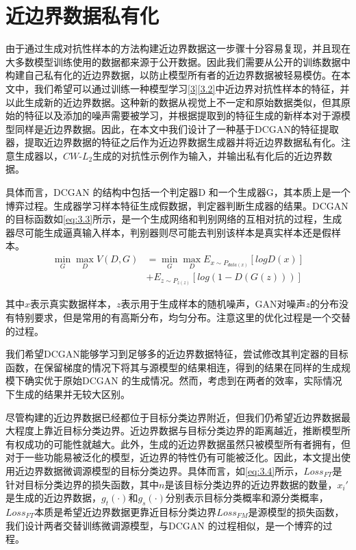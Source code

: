 \section{近边界数据私有化}\label{3.3}

由于通过生成对抗性样本的方法构建近边界数据这一步骤十分容易复现，并且现在大多数模型训练使用的数据都来源于公开数据。因此我们需要从公开的训练数据中构建自己私有化的近边界数据，以防止模型所有者的近边界数据被轻易模仿。在本文中，我们希望可以通过训练一种模型学习\ref{3}\ref{3.2}中近边界对抗性样本的特征，并以此生成新的近边界数据。这种新的数据从视觉上不一定和原始数据类似，但其原始的特征以及添加的噪声需要被学习，并根据提取到的特征生成的新样本对于源模型同样是近边界数据。因此，在本文中我们设计了一种基于DCGAN\cite{radford2015unsupervised}的特征提取器，提取近边界数据的特征之后作为近边界数据生成器并将近边界数据私有化。注意生成器以，$CW$-$L_2$生成的对抗性示例作为输入，并输出私有化后的近边界数据。

具体而言，DCGAN 的结构中包括一个判定器D 和一个生成器G，其本质上是一个博弈过程。生成器学习样本特征生成假数据，判定器判断生成器的结果。DCGAN 的目标函数如\ref{eq:3.3}所示，是一个生成网络和判别网络的互相对抗的过程，生成器尽可能生成逼真输入样本，判别器则尽可能去判别该样本是真实样本还是假样本。
\begin{equation}
	\label{eq:3.3}
	\begin{split}
		\mathop{min} \limits_{G} \mathop{max} \limits_{D} V(D, G) &= \mathop{min} \limits_{G} \mathop{max} \limits_{D} E_{x \sim P_{data(x)}}[logD(x)] \\
		&+ E_{z \sim P_{z(z)}}[log(1 - D(G(z)))]
	\end{split}
\end{equation}

\noindent 其中$x$表示真实数据样本，$z$表示用于生成样本的随机噪声，GAN对噪声$z$的分布没有特别要求，但是常用的有高斯分布，均匀分布。注意这里的优化过程是一个交替的过程。

我们希望DCGAN能够学习到足够多的近边界数据特征，尝试修改其判定器的目标函数，在保留梯度的情况下将其与源模型的结果相连，得到的结果在同样的生成规模下确实优于原始DCGAN 的生成情况。然而，考虑到在两者的效率，实际情况下生成的结果并无较大区别。

尽管构建的近边界数据已经都位于目标分类边界附近，但我们仍希望近边界数据最大程度上靠近目标分类边界。近边界数据与目标分类边界的距离越近，推断模型所有权成功的可能性就越大。此外，生成的近边界数据虽然只被模型所有者拥有，但对于一些功能易被泛化的模型，近边界的特性仍有可能被泛化。因此，本文提出使用近边界数据微调源模型的目标分类边界。具体而言，如\ref{eq:3.4}所示，$Loss_{FT}$是针对目标分类边界的损失函数，其中$n$是该目标分类边界的近边界数据的数量，$x_i'$是生成的近边界数据，$g_t(\cdot)$和$g_s(\cdot)$分别表示目标分类概率和源分类概率，$Loss_{FT}$本质是希望近边界数据更靠近目标分类边界$Loss_{FM}$是源模型的损失函数，我们设计两者交替训练微调源模型，与DCGAN 的过程相似，是一个博弈的过程。

